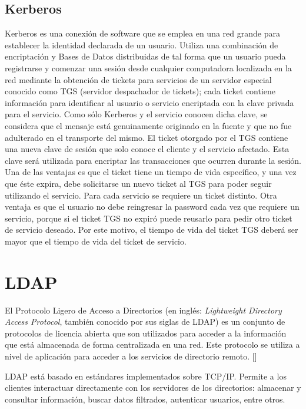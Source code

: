 \subsection{Kerberos}
Kerberos es una conexión de software que se emplea en una red grande para establecer la identidad declarada de un usuario. Utiliza una combinación de encriptación y Bases de Datos distribuidas de tal forma que un usuario pueda registrarse y comenzar una sesión desde cualquier computadora localizada en la red mediante la obtención de tickets para servicios de un servidor especial conocido como TGS (servidor despachador de tickets); cada ticket contiene información para identificar al usuario o servicio encriptada con la clave privada para el servicio. Como sólo Kerberos y el servicio conocen dicha clave, se considera que el mensaje está genuinamente originado en la fuente y que no fue adulterado en el transporte del mismo. El ticket otorgado por el TGS contiene una nueva clave de sesión que solo conoce el cliente y el servicio afectado. Esta clave será utilizada para encriptar las transacciones que ocurren durante la sesión.
Una de las ventajas es que el ticket tiene un tiempo de vida específico, y una vez que éste expira, debe solicitarse un nuevo ticket al TGS para poder seguir utilizando el servicio. Para cada servicio se requiere un ticket distinto. Otra ventaja es que el usuario no debe reingresar la password cada vez que requiere un servicio, porque si el ticket TGS no expiró puede reusarlo para pedir otro ticket de servicio deseado. Por este motivo, el tiempo de vida del ticket TGS deberá ser mayor que el tiempo de vida del ticket de servicio.


\section{LDAP}
El Protocolo Ligero de Acceso a Directorios (en inglés: \textit{Lightweight Directory Access Protocol}, también conocido por sus siglas de LDAP) es un conjunto de protocolos de licencia abierta que son utilizados para acceder a la información que está almacenada de forma centralizada en una red. Este protocolo se utiliza a nivel de aplicación para acceder a los servicios de directorio remoto. [\cite{ldap-doc}]

LDAP está basado en estándares implementados sobre TCP/IP. Permite a los clientes interactuar directamente con los servidores de los directorios: almacenar y consultar información, buscar datos filtrados, autenticar usuarios, entre otros.

